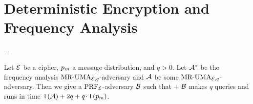 \section{Deterministic Encryption and Frequency Analysis}
\label{sec:freqanalysis}



\begin{figure}
\end{figure}

\begin{figure}
\end{figure}



\bnm
    = 
\enm


\begin{theorem}
Let ${\cal E}$ be a cipher, $p_m$ a message distribution, and $q>0$. Let
${\mathcal A}^*$ be the frequency analysis $\textnormal{MR-UMA}_{{\cal E},q}$-adversary and ${\mathcal A}$
be some $\textnormal{MR-UMA}_{{\cal E},q}$-adversary. Then we give a
$\textnormal{PRF}_{\cal E}$-adversary ${\mathcal B}$ such that
\bnm
   \le 
         + \AdvPRF{\cipher}{\advB}
\enm
${\mathcal B}$ makes $q$ queries and runs in time 
$\textsf{T}({\mathcal A}) + 2q+q{\hspace{-0.1ex}}{\hspace{-0.1ex}}{\hspace{-0.1ex}}\cdot{\hspace{-0.1ex}}{\hspace{-0.1ex}}{\hspace{-0.1ex}}\textsf{T}(p_m)$.
\end{theorem}


